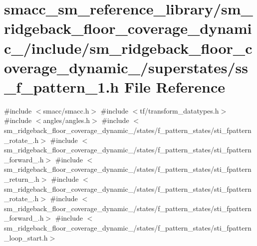 \hypertarget{sm__ridgeback__floor__coverage__dynamic__1_2include_2sm__ridgeback__floor__coverage__dynamic__1_7f00dbae6bef0014e9718705856cc61c}{}\section{smacc\+\_\+sm\+\_\+reference\+\_\+library/sm\+\_\+ridgeback\+\_\+floor\+\_\+coverage\+\_\+dynamic\+\_/include/sm\+\_\+ridgeback\+\_\+floor\+\_\+coverage\+\_\+dynamic\+\_/superstates/ss\+\_\+f\+\_\+pattern\+\_\+1.h File Reference}
\label{sm__ridgeback__floor__coverage__dynamic__1_2include_2sm__ridgeback__floor__coverage__dynamic__1_7f00dbae6bef0014e9718705856cc61c}
{\ttfamily \#include $<$smacc/smacc.\+h$>$}\newline
{\ttfamily \#include $<$tf/transform\+\_\+datatypes.\+h$>$}\newline
{\ttfamily \#include $<$angles/angles.\+h$>$}\newline
{\ttfamily \#include $<$sm\+\_\+ridgeback\+\_\+floor\+\_\+coverage\+\_\+dynamic\+\_/states/f\+\_\+pattern\+\_\+states/sti\+\_\+fpattern\+\_\+rotate\+\_.\+h$>$}\newline
{\ttfamily \#include $<$sm\+\_\+ridgeback\+\_\+floor\+\_\+coverage\+\_\+dynamic\+\_/states/f\+\_\+pattern\+\_\+states/sti\+\_\+fpattern\+\_\+forward\+\_.\+h$>$}\newline
{\ttfamily \#include $<$sm\+\_\+ridgeback\+\_\+floor\+\_\+coverage\+\_\+dynamic\+\_/states/f\+\_\+pattern\+\_\+states/sti\+\_\+fpattern\+\_\+return\+\_.\+h$>$}\newline
{\ttfamily \#include $<$sm\+\_\+ridgeback\+\_\+floor\+\_\+coverage\+\_\+dynamic\+\_/states/f\+\_\+pattern\+\_\+states/sti\+\_\+fpattern\+\_\+rotate\+\_.\+h$>$}\newline
{\ttfamily \#include $<$sm\+\_\+ridgeback\+\_\+floor\+\_\+coverage\+\_\+dynamic\+\_/states/f\+\_\+pattern\+\_\+states/sti\+\_\+fpattern\+\_\+forward\+\_.\+h$>$}\newline
{\ttfamily \#include $<$sm\+\_\+ridgeback\+\_\+floor\+\_\+coverage\+\_\+dynamic\+\_/states/f\+\_\+pattern\+\_\+states/sti\+\_\+fpattern\+\_\+loop\+\_\+start.\+h$>$}\newline
